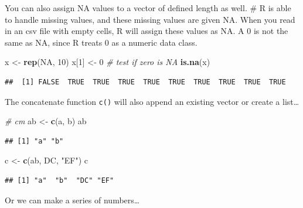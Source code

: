 \documentclass[
]{book}
\newenvironment{Shaded}{\begin{snugshade}}{\end{snugshade}}
\newcommand{\CommentTok}[1]{\textcolor[rgb]{0.56,0.35,0.01}{\textit{#1}}}
\newcommand{\ConstantTok}[1]{\textcolor[rgb]{0.56,0.35,0.01}{#1}}
\newcommand{\DecValTok}[1]{\textcolor[rgb]{0.00,0.00,0.81}{#1}}
\newcommand{\FunctionTok}[1]{\textcolor[rgb]{0.13,0.29,0.53}{\textbf{#1}}}
\newcommand{\NormalTok}[1]{#1}
\newcommand{\OtherTok}[1]{\textcolor[rgb]{0.56,0.35,0.01}{#1}}
\newcommand{\StringTok}[1]{\textcolor[rgb]{0.31,0.60,0.02}{#1}}
\begin{document}
You can also assign NA values to a vector of defined length as well. \# R is able to handle missing values, and these missing values are given NA. When
you read in an csv file with empty cells, R will assign these values as NA. A 0
is not the same as NA, since R treats 0 as a numeric data class.

\begin{Shaded}
\begin{Highlighting}[]
\NormalTok{x }\OtherTok{\textless{}{-}} \FunctionTok{rep}\NormalTok{(}\ConstantTok{NA}\NormalTok{, }\DecValTok{10}\NormalTok{)}
\NormalTok{x[}\DecValTok{1}\NormalTok{] }\OtherTok{\textless{}{-}} \DecValTok{0}
\CommentTok{\# test if zero is NA}
\FunctionTok{is.na}\NormalTok{(x)}
\end{Highlighting}
\end{Shaded}

\begin{verbatim}
##  [1] FALSE  TRUE  TRUE  TRUE  TRUE  TRUE  TRUE  TRUE  TRUE  TRUE
\end{verbatim}

The concatenate function \texttt{c()} will also append an existing vector or create a list\ldots{}

\begin{Shaded}
\begin{Highlighting}[]
\CommentTok{\# cm}
\NormalTok{ab }\OtherTok{\textless{}{-}} \FunctionTok{c}\NormalTok{(}\StringTok{\textquotesingle{}a\textquotesingle{}}\NormalTok{, }\StringTok{\textquotesingle{}b\textquotesingle{}}\NormalTok{)}
\NormalTok{ab}
\end{Highlighting}
\end{Shaded}

\begin{verbatim}
## [1] "a" "b"
\end{verbatim}

\begin{Shaded}
\begin{Highlighting}[]
\NormalTok{c }\OtherTok{\textless{}{-}} \FunctionTok{c}\NormalTok{(ab, }\StringTok{\textquotesingle{}DC\textquotesingle{}}\NormalTok{, }\StringTok{"EF"}\NormalTok{)}
\NormalTok{c}
\end{Highlighting}
\end{Shaded}

\begin{verbatim}
## [1] "a"  "b"  "DC" "EF"
\end{verbatim}

Or we can make a series of numbers\ldots{}
\end{document}
